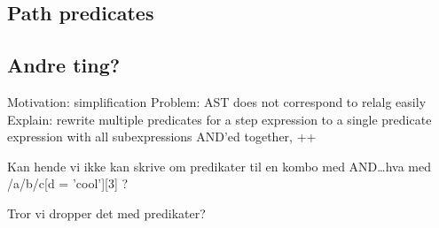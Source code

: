 \subsection{Path predicates}

\subsection{Andre ting?}
 
Motivation: simplification
Problem: AST does not correspond to relalg easily
Explain: rewrite multiple predicates for a step expression to a single 
         predicate expression with all subexpressions AND'ed together, ++

Kan hende vi ikke kan skrive om predikater til en kombo med AND\ldots hva med
/a/b/c[d = 'cool'][3] ?

Tror vi dropper det med predikater?